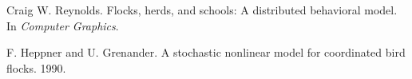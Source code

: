 \documentclass{article}
\begin{document}




\item
  Craig W. Reynolds. Flocks, herds, and schools: A distributed behavioral model.
In \textit{Computer Graphics}.
\item
F. Heppner and U. Grenander. A stochastic nonlinear model for coordinated
bird flocks. 1990.
\end{document}
